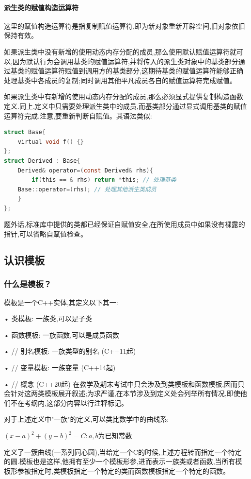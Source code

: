 \documentclass[UTF8]{ctexart}
\begin{document}
\paragraph{派生类的赋值构造运算符}
这里的赋值构造运算符是指复制赋值运算符,即为新对象重新开辟空间,旧对象依旧保持有效。

如果派生类中没有新增的使用动态内存分配的成员,那么使用默认赋值运算符就可以,因为默认行为会调用基类的赋值运算符,并将传入的派生类对象中的基类部分通过基类的赋值运算符赋值到调用方的基类部分,这期待基类的赋值运算符能够正确处理基类中各成员的复制;同时调用其他平凡成员各自的赋值运算符完成赋值。

如果派生类中有新增的使用动态内存分配的成员,那么必须显式提供复制构造函数定义.同上,定义中只需要处理派生类中的成员,而基类部分通过显式调用基类的赋值运算符完成.注意,要重新判断自赋值。其语法类似:
\begin{lstlisting}[language = C,basicstyle=\small\ttfamily]
struct Base{ 
    virtual void f() {} 
};
struct Derived : Base{ 
    Derived& operator=(const Derived& rhs){
        if(this == & rhs) return *this; // 处理基类        
    Base::operator=(rhs); // 处理其他派生类成员    
    }
};
\end{lstlisting}

题外话,标准库中提供的类都已经保证自赋值安全,在所使用成员中如果没有裸露的指针,可以省略自赋值检查。

\subsection{认识模板}
\subsubsection{什么是模板？}
模板是一个C++实体,其定义以下其一:

• 类模板: 一族类,可以是子类

• 函数模板: 一族函数,可以是成员函数

• // 别名模板: 一族类型的别名 (C++11起)

• // 变量模板: 一族变量 (C++14起)

• // 概念 (C++20起) 在教学及期末考试中只会涉及到类模板和函数模板,因而只会针对这两类模板展开叙述;为求严谨,在本节涉及到定义处会列举所有情况,即使他们不在考纲内,这部分内容以行注释标记。

对于上述定义中"一族"的定义,可以类比数学中的曲线系:

$(x-a)^2+(y-b)^2=C:a,b$为已知常数

定义了一簇曲线(一系列同心圆),当给定一个C的时候,上述方程转而指定一个特定的圆.模板也是这样,他拥有至少一个模板形参,进而表示一族类或者函数,当所有模板形参被指定时,类模板指定一个特定的类而函数模板指定一个特定的函数。
\end{document}
